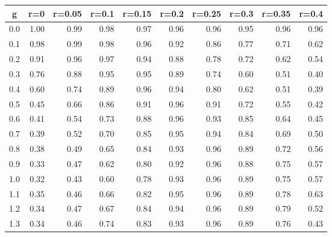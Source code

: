 %
\begin{table}[!tbp]
 \begin{center}
 \begin{tabular}{rrrrrrrrrr}\hline\hline
\multicolumn{1}{c}{g}&\multicolumn{1}{c}{r=0}&\multicolumn{1}{c}{r=0.05}&\multicolumn{1}{c}{r=0.1}&\multicolumn{1}{c}{r=0.15}&\multicolumn{1}{c}{r=0.2}&\multicolumn{1}{c}{r=0.25}&\multicolumn{1}{c}{r=0.3}&\multicolumn{1}{c}{r=0.35}&\multicolumn{1}{c}{r=0.4}\tabularnewline
\hline
0.0&1.00&0.99&0.98&0.97&0.96&0.96&0.95&0.96&0.96\tabularnewline
0.1&0.98&0.99&0.98&0.96&0.92&0.86&0.77&0.71&0.62\tabularnewline
0.2&0.91&0.96&0.97&0.94&0.88&0.78&0.72&0.62&0.54\tabularnewline
0.3&0.76&0.88&0.95&0.95&0.89&0.74&0.60&0.51&0.40\tabularnewline
0.4&0.60&0.74&0.89&0.96&0.94&0.80&0.62&0.51&0.39\tabularnewline
0.5&0.45&0.66&0.86&0.91&0.96&0.91&0.72&0.55&0.42\tabularnewline
0.6&0.41&0.54&0.73&0.88&0.96&0.93&0.85&0.64&0.45\tabularnewline
0.7&0.39&0.52&0.70&0.85&0.95&0.94&0.84&0.69&0.50\tabularnewline
0.8&0.38&0.49&0.65&0.84&0.93&0.96&0.89&0.72&0.56\tabularnewline
0.9&0.33&0.47&0.62&0.80&0.92&0.96&0.88&0.75&0.57\tabularnewline
1.0&0.32&0.43&0.60&0.78&0.93&0.96&0.89&0.75&0.57\tabularnewline
1.1&0.35&0.46&0.66&0.82&0.95&0.96&0.89&0.78&0.63\tabularnewline
1.2&0.34&0.47&0.67&0.84&0.94&0.96&0.89&0.79&0.52\tabularnewline
1.3&0.34&0.46&0.74&0.83&0.93&0.96&0.89&0.76&0.43\tabularnewline
\hline
\end{tabular}

\end{center}

\end{table}

